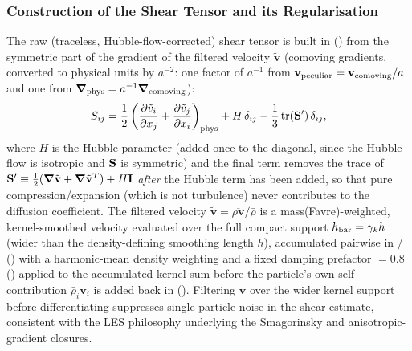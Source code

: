 \subsubsection{Construction of the Shear Tensor and its Regularisation}
\label{sec:shear-def}
The raw (traceless, Hubble-flow-corrected) shear tensor is built in
() from the symmetric part of the
gradient of the filtered velocity $\tilde{\mathbf v}$ (comoving
gradients, converted to physical units by $a^{-2}$: one factor of
$a^{-1}$ from $\mathbf v_{\rm peculiar} = \mathbf v_{\rm comoving}/a$ and
one from $\grad_{\rm phys} = a^{-1}\grad_{\rm comoving}$):
\begin{equation}
  \label{eq:shear_raw}
  S_{ij} = \frac{1}{2}
           \left(\pdv{\tilde v_i}{x_j} + \pdv{\tilde v_j}{x_i}\right)_{\rm phys}
           + H\,\delta_{ij}
           - \frac{1}{3}\,\mathrm{tr}(\mathbf{S}')\,\delta_{ij} ,
\end{equation}
where $H$ is the Hubble parameter (added once to the diagonal, since the
Hubble flow is isotropic and $\mathbf{S}$ is symmetric) and the final term
removes the trace of $\mathbf{S}' \equiv \tfrac12(\grad\tilde{\mathbf v} +
\grad\tilde{\mathbf v}^T) + H\mathbf I$ \emph{after} the Hubble term has
been added, so that pure compression/expansion (which is not turbulence)
never contributes to the diffusion coefficient. The filtered velocity
$\tilde{\mathbf v} = \overline{\rho\mathbf v}/\bar\rho$ is a
mass(Favre)-weighted, kernel-smoothed velocity evaluated over the full
compact support $h_{\rm bar} = \gamma_{k} h$ (wider than the density-defining
smoothing length $h$), accumulated pairwise in
/
() with a harmonic-mean density weighting
and a fixed damping prefactor
$= 0.8$
() applied to the accumulated kernel sum before the
particle's own self-contribution $\bar\rho_i \mathbf v_i$ is added back
in  (). Filtering
$\mathbf v$ over the wider kernel support before differentiating
suppresses single-particle noise in the shear estimate, consistent with
the LES philosophy underlying the Smagorinsky and anisotropic-gradient
closures.

